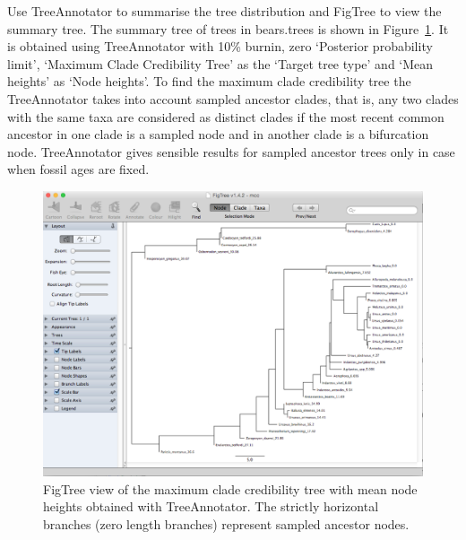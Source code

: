 \documentclass[12pt]{article}
\begin{document}
Use TreeAnnotator to summarise the tree distribution and FigTree to view the summary tree. The summary tree of trees in bears.trees is shown in Figure~\ref{fig:FigTree}. It is obtained using TreeAnnotator with 10\% burnin, zero `Posterior probability limit', `Maximum Clade Credibility Tree' as the `Target tree type' and `Mean heights' as `Node heights'. To find the maximum clade credibility tree the TreeAnnotator takes into account sampled ancestor clades, that is, any two clades with the same taxa are considered as distinct clades if the most recent common ancestor in one clade is a sampled node and in another clade is a bifurcation node. TreeAnnotator gives sensible results for sampled ancestor trees only in case when fossil ages are fixed.  

\begin{figure}	
\centering
\includegraphics[width=\textwidth]{figures/FigTree}
\caption{FigTree view of the maximum clade credibility tree with mean node heights obtained with TreeAnnotator. The strictly horizontal branches (zero length branches) represent sampled ancestor nodes. \label{fig:FigTree}}
\end{figure}



\end{document}
